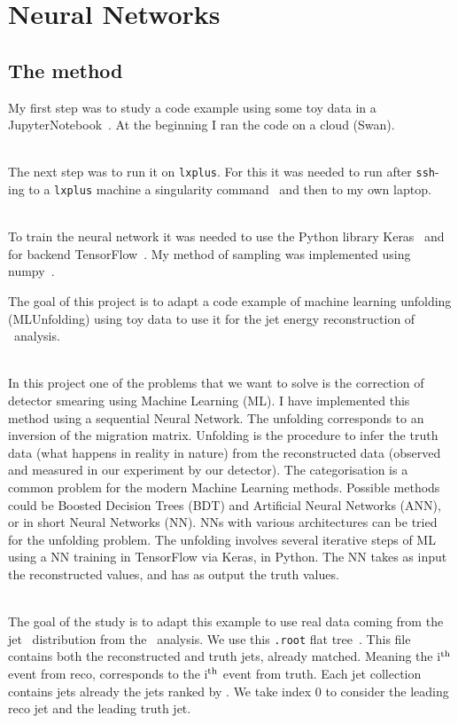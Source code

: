 \section{Neural Networks}
\label{sec:NeuralNetworks}

\subsection{The method}
\label{sec:Method}

My first step was to study a code example using some toy data in a JupyterNotebook~\cite{AGlazov}. At the beginning I ran the code on a cloud (Swan). 

\ \\The next step was to run it on \texttt{lxplus}. For this it was needed to run after \texttt{ssh}-ing to a \texttt{lxplus} machine a singularity command~\cite{Singularity} and then to my own laptop.

\ \\To train the neural network it was needed to use the Python library Keras~\cite{keras} and for backend TensorFlow~\cite{tensorflow}. My method of sampling was implemented using numpy~\cite{numpy}.

The goal of this project is to adapt a code example of machine learning unfolding (MLUnfolding) using toy data to use it for the jet energy reconstruction of \ttbaremu~analysis.

\ \\In this project one of the problems that we want to solve is the correction of detector smearing using Machine Learning (ML). I have implemented this method using a sequential Neural Network. The unfolding corresponds to an inversion of the migration matrix. Unfolding is the procedure to infer the truth data (what happens in reality in nature) from the reconstructed data (observed and measured in our experiment by our detector). The categorisation is a common problem for the modern Machine Learning methods. Possible methods could be Boosted Decision Trees (BDT) and Artificial Neural Networks (ANN), or in short Neural Networks (NN). NNs with various architectures can be tried for the unfolding problem. The unfolding involves several iterative steps of ML using a NN training in TensorFlow via Keras, in Python. The NN takes as input the reconstructed values, and has as output the truth values.

\ \\The goal of the study is to adapt this example to use real data coming from the jet \pt~distribution from the \ttbaremu~analysis. We use this \texttt{.root} flat tree~\cite{RootFile}. This file contains both the reconstructed and truth jets, already matched. Meaning the i$^{\rm th}$ event from reco, corresponds to the i$^{\rm th}$ event from truth. Each jet collection contains jets already the jets ranked by \pt. We take index 0 to consider the leading reco jet and the leading truth jet.

